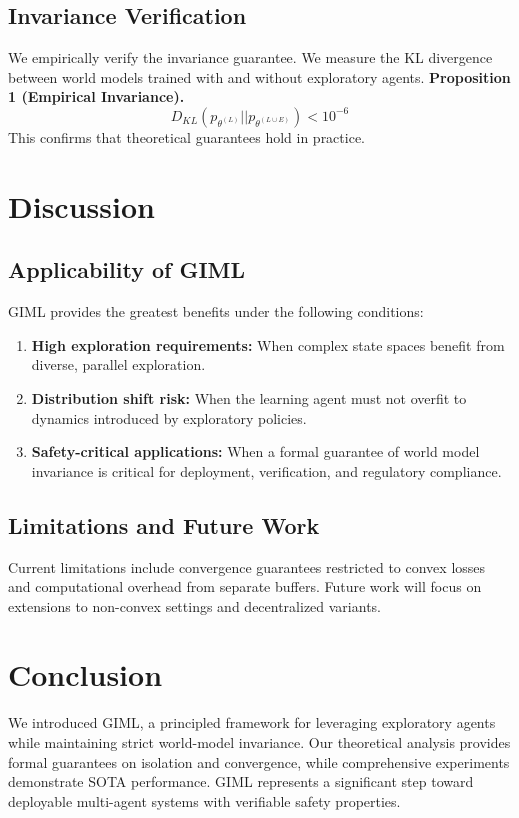 \documentclass[11pt,a4paper]{article}
\begin{document}
\subsection{Invariance Verification}
We empirically verify the invariance guarantee. We measure the KL divergence between world models trained with and without exploratory agents.
\textbf{Proposition 1 (Empirical Invariance).}
\begin{equation}
    D_{KL}(p_{\theta^{(L)}} || p_{\theta^{(L \cup E)}}) < 10^{-6}
\end{equation}
This confirms that theoretical guarantees hold in practice.

\section{Discussion}
\subsection{Applicability of GIML}
GIML provides the greatest benefits under the following conditions:
\begin{enumerate}
    \item \textbf{High exploration requirements:} When complex state spaces benefit from diverse, parallel exploration.
    \item \textbf{Distribution shift risk:} When the learning agent must not overfit to dynamics introduced by exploratory policies.
    \item \textbf{Safety-critical applications:} When a formal guarantee of world model invariance is critical for deployment, verification, and regulatory compliance.
\end{enumerate}

\subsection{Limitations and Future Work}
Current limitations include convergence guarantees restricted to convex losses and computational overhead from separate buffers. Future work will focus on extensions to non-convex settings and decentralized variants.

\section{Conclusion}
We introduced GIML, a principled framework for leveraging exploratory agents while maintaining strict world-model invariance. Our theoretical analysis provides formal guarantees on isolation and convergence, while comprehensive experiments demonstrate SOTA performance. GIML represents a significant step toward deployable multi-agent systems with verifiable safety properties.
\end{document}

